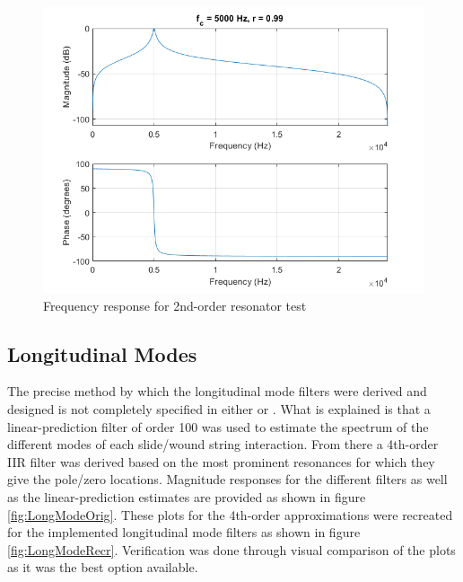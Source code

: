 \documentclass[../main.tex]{subfiles}
\begin{document}
\begin{figure}[h]
    \centering
    \includegraphics[scale=.65]{./images/plots/ResonatorTest.png}
    \caption{Frequency response for 2nd-order resonator test}
    \label{fig:ResoTest}
\end{figure}

\subsection{Longitudinal Modes}
The precise method by which the longitudinal mode filters were derived and designed is not completely specified in either  or . What is explained is that a linear-prediction filter of order 100 was used to estimate the spectrum of the different modes of each slide/wound string interaction. From there a 4th-order IIR filter was derived based on the most prominent resonances for which they give the pole/zero locations. Magnitude responses for the different filters as well as the linear-prediction estimates are provided as shown in figure \ref{fig:LongModeOrig}. These plots for the 4th-order approximations were recreated for the implemented longitudinal mode filters as shown in figure \ref{fig:LongModeRecr}. Verification was done through visual comparison of the plots as it was the best option available.
\end{document}
